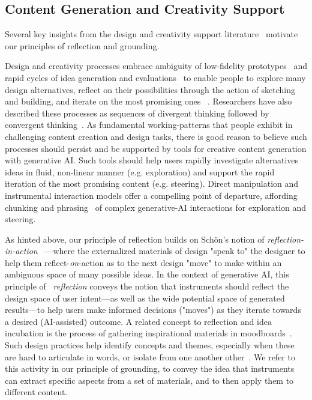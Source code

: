 \subsection{Content Generation and Creativity Support}


Several key insights from the design and creativity support literature~\cite{shneiderman_creativity_2007} motivate our principles of reflection and grounding.

Design and creativity processes embrace ambiguity of low-fidelity prototypes~\cite{BuxtonSketchingUserExperiences2007} and rapid cycles of idea generation and evaluations~\cite{TEAMSTORM2007, TerryCreativeNeedsUIDesign2002, ReflectivePhysicalPrototyping2006} to enable people to explore many design alternatives, reflect on their possibilities through the action of sketching and building, and iterate on the most promising ones ~\cite{DesignReflectiveConversation1992}. Researchers have also described these processes as sequences of divergent thinking followed by convergent thinking~\cite{farooq2005supporting}. As fundamental working-patterns that people exhibit in challenging content creation and design tasks, there is good reason to believe such processes should persist and be supported by tools for creative content generation with generative AI. Such tools should help users rapidly investigate alternatives ideas in fluid, non-linear manner (e.g. exploration) and support the rapid iteration of the most promising content (e.g. steering). Direct manipulation and instrumental interaction models offer a compelling point of departure, affording chunking and phrasing~\cite{buxton1995chunking} of complex generative-AI interactions for exploration and steering.


As hinted above, our principle of reflection builds on Schön's notion of \textit{reflection-in-action} 
~\cite{DesignReflectiveConversation1992}---where the externalized materials of design "speak to" the designer to help them reflect-\textit{on}-action as to the next design "move" to make within an ambiguous space of many possible ideas. 
In the context of generative AI, this principle of ~\textit{reflection} conveys the notion that instruments should reflect the design space of user intent---as well as the wide potential space of generated results---to help users make informed decisions ("moves") as they iterate towards a desired (AI-assisted) outcome. A related concept to reflection and idea incubation is the process of gathering inspirational materials in moodboards~\cite{cassidy2008mood, BuxtonSketchingUserExperiences2007}. Such design practices help identify concepts and themes, especially when these are hard to articulate in words, or isolate from one another other~\cite{freeman2017creativity}. We refer to this activity in our principle of grounding, to convey the idea that instruments can extract specific aspects from a set of materials, and to then apply them to different content.

